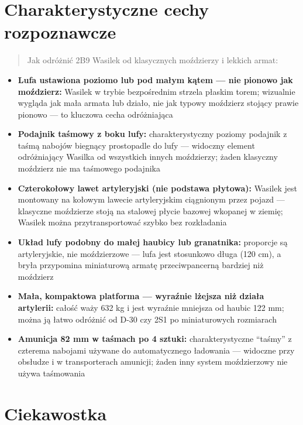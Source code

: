 \documentclass[12pt,openany,oneside]{book}
\providecommand{\tightlist}{%
  \setlength{\itemsep}{0pt}\setlength{\parskip}{0pt}}
\begin{document}
\section{Charakterystyczne cechy
rozpoznawcze}\label{charakterystyczne-cechy-rozpoznawcze-24}

\begin{quote}
Jak odróżnić 2B9 Wasilek od klasycznych moździerzy i lekkich armat:
\end{quote}

\begin{itemize}
\tightlist
\item
  \textbf{Lufa ustawiona poziomo lub pod małym kątem --- nie pionowo jak
  moździerz:} Wasilek w trybie bezpośrednim strzela płaskim torem;
  wizualnie wygląda jak mała armata lub działo, nie jak typowy moździerz
  stojący prawie pionowo --- to kluczowa cecha odróżniająca
\item
  \textbf{Podajnik taśmowy z boku lufy:} charakterystyczny poziomy
  podajnik z taśmą nabojów biegnący prostopadle do lufy --- widoczny
  element odróżniający Wasilka od wszystkich innych moździerzy; żaden
  klasyczny moździerz nie ma taśmowego podajnika
\item
  \textbf{Czterokołowy lawet artyleryjski (nie podstawa płytowa):}
  Wasilek jest montowany na kołowym lawecie artyleryjskim ciągnionym
  przez pojazd --- klasyczne moździerze stoją na stalowej płycie bazowej
  wkopanej w ziemię; Wasilek można przytransportować szybko bez
  rozkładania
\item
  \textbf{Układ lufy podobny do małej haubicy lub granatnika:} proporcje
  są artyleryjskie, nie moździerzowe --- lufa jest stosunkowo długa (120
  cm), a bryła przypomina miniaturową armatę przeciwpancerną bardziej
  niż moździerz
\item
  \textbf{Mała, kompaktowa platforma --- wyraźnie lżejsza niż działa
  artylerii:} całość waży 632 kg i jest wyraźnie mniejsza od haubic 122
  mm; można ją łatwo odróżnić od D-30 czy 2S1 po miniaturowych
  rozmiarach
\item
  \textbf{Amunicja 82 mm w taśmach po 4 sztuki:} charakterystyczne
  ``taśmy'' z czterema nabojami używane do automatycznego ładowania ---
  widoczne przy obsłudze i w transporterach amunicji; żaden inny system
  moździerzowy nie używa taśmowania
\end{itemize}

\section{Ciekawostka}\label{ciekawostka-24}
\end{document}
